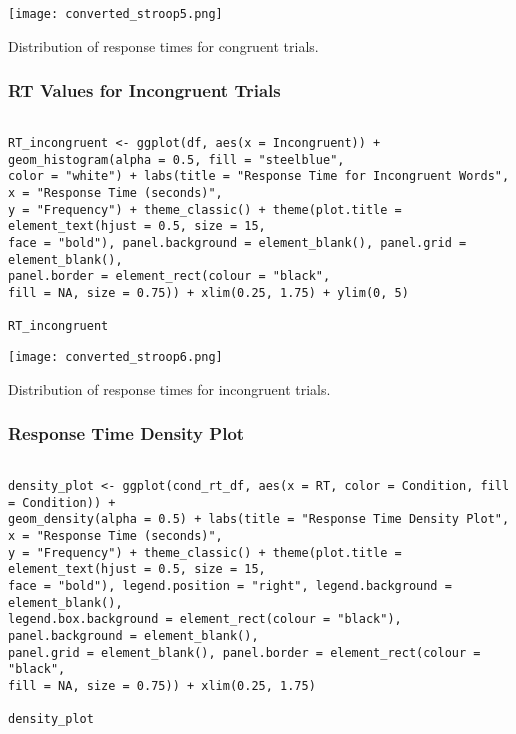 \documentclass{article}
\begin{document}
\begin{center}
\texttt{[image: converted\_stroop5.png]}
\end{center}

\begin{center}
Distribution of response times for congruent trials.
\end{center}

\subsubsection{RT Values for Incongruent Trials}
\label{sec:org34e3034}
\begin{verbatim}

RT_incongruent <- ggplot(df, aes(x = Incongruent)) + geom_histogram(alpha = 0.5, fill = "steelblue", 
color = "white") + labs(title = "Response Time for Incongruent Words", x = "Response Time (seconds)", 
y = "Frequency") + theme_classic() + theme(plot.title = element_text(hjust = 0.5, size = 15, 
face = "bold"), panel.background = element_blank(), panel.grid = element_blank(), 
panel.border = element_rect(colour = "black", 
fill = NA, size = 0.75)) + xlim(0.25, 1.75) + ylim(0, 5)

RT_incongruent

\end{verbatim}

\begin{center}
\texttt{[image: converted\_stroop6.png]}
\end{center}

\begin{center}
Distribution of response times for incongruent trials.
\end{center}
\subsubsection{Response Time Density Plot}
\label{sec:orga26db6b}
\begin{verbatim}

density_plot <- ggplot(cond_rt_df, aes(x = RT, color = Condition, fill = Condition)) + 
geom_density(alpha = 0.5) + labs(title = "Response Time Density Plot", x = "Response Time (seconds)", 
y = "Frequency") + theme_classic() + theme(plot.title = element_text(hjust = 0.5, size = 15, 
face = "bold"), legend.position = "right", legend.background = element_blank(), 
legend.box.background = element_rect(colour = "black"), panel.background = element_blank(), 
panel.grid = element_blank(), panel.border = element_rect(colour = "black", 
fill = NA, size = 0.75)) + xlim(0.25, 1.75) 

density_plot

\end{verbatim}
\end{document}

